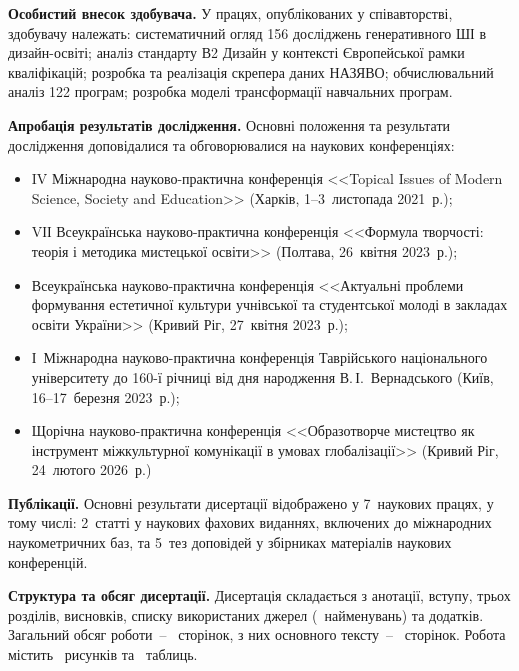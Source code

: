 \textbf{Особистий внесок здобувача.} У працях, опублікованих у співавторстві, здобувачу належать: систематичний огляд 156 досліджень генеративного ШІ в дизайн-освіті; аналіз стандарту В2 Дизайн у контексті Європейської рамки кваліфікацій; розробка та реалізація скрепера даних НАЗЯВО; обчислювальний аналіз 122 програм; розробка моделі трансформації навчальних програм.

\textbf{Апробація результатів дослідження.} Основні положення та результати дослідження доповідалися та обговорювалися на наукових конференціях:
\begin{itemize}
    \item IV Міжнародна науково-практична конференція <<Topical Issues of Modern Science, Society and Education>> (Харків, 1--3~листопада 2021~р.);
    \item VІІ Всеукраїнська науково-практична конференція <<Формула творчості: теорія і методика мистецької освіти>> (Полтава, 26~квітня 2023~р.);
    \item Всеукраїнська науково-практична конференція <<Актуальні проблеми формування естетичної культури учнівської та студентської молоді в закладах освіти України>> (Кривий Ріг, 27~квітня 2023~р.);
    \item І~Міжнародна науково-практична конференція Таврійського національного університету до 160-ї річниці від дня народження В.\,І.~Вернадського (Київ, 16--17~березня 2023~р.);
    \item Щорічна науково-практична конференція <<Образотворче мистецтво як інструмент міжкультурної комунікації в умовах глобалізації>> (Кривий Ріг, 24~лютого 2026~р.)
\end{itemize}

\textbf{Публікації.} Основні результати дисертації відображено у 7~наукових працях, у тому числі: 2~статті у наукових фахових виданнях, включених до міжнародних наукометричних баз, та 5~тез доповідей у збірниках матеріалів наукових конференцій.

\textbf{Структура та обсяг дисертації.} Дисертація складається з анотації, вступу, трьох розділів, висновків, списку використаних джерел (~найменувань) та додатків. Загальний обсяг роботи~-- \pageref{last_page}~сторінок, з них основного тексту~-- \pageref{end_main_text}~сторінок. Робота містить \totalfigures~рисунків та \totaltables~таблиць.
